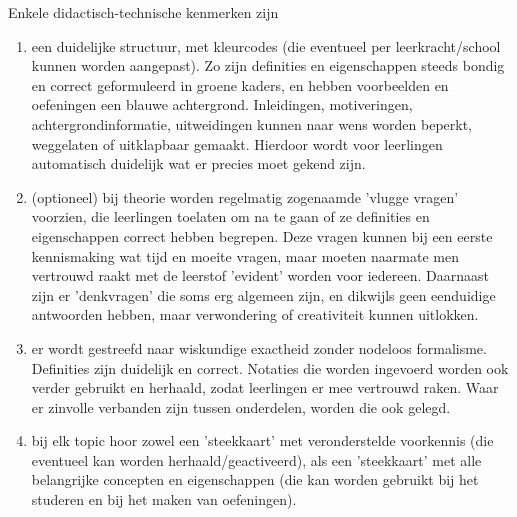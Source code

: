 \documentclass{ximera}
\begin{document}
    Enkele didactisch-technische kenmerken zijn
    \begin{enumerate}
        \item een duidelijke structuur, met kleurcodes (die eventueel per leerkracht/school kunnen worden aangepast). Zo zijn definities en eigenschappen steeds bondig en correct geformuleerd in groene kaders, en hebben voorbeelden en oefeningen een blauwe achtergrond. Inleidingen, motiveringen, achtergrondinformatie, uitweidingen kunnen naar wens worden beperkt, weggelaten of uitklapbaar gemaakt. Hierdoor wordt voor leerlingen automatisch duidelijk wat er precies moet gekend zijn.
        \item (optioneel) bij theorie worden regelmatig zogenaamde 'vlugge vragen' voorzien, die leerlingen toelaten om na te gaan of ze definities en eigenschappen correct hebben begrepen. Deze vragen kunnen bij een eerste kennismaking wat tijd en moeite vragen, maar moeten naarmate men vertrouwd raakt met de leerstof 'evident' worden voor iedereen. Daarnaast zijn er 'denkvragen' die soms erg algemeen zijn, en dikwijls geen eenduidige antwoorden hebben, maar verwondering of creativiteit kunnen uitlokken.
        \item er wordt gestreefd naar wiskundige exactheid zonder nodeloos formalisme. Definities zijn duidelijk en correct. Notaties die worden ingevoerd worden ook verder gebruikt en herhaald, zodat leerlingen er mee vertrouwd raken. Waar er zinvolle verbanden zijn tussen onderdelen, worden die ook gelegd.
        \item bij elk topic hoor zowel een 'steekkaart' met veronderstelde voorkennis (die eventueel kan worden herhaald/geactiveerd), als een 'steekkaart' met alle belangrijke concepten en eigenschappen (die kan worden gebruikt bij het studeren en bij het maken van oefeningen).
    \end{enumerate}
\end{document}
